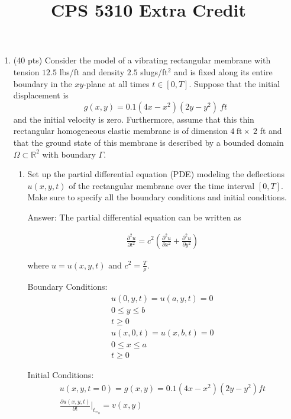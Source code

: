 \documentclass[12pt]{article}
\title{CPS 5310 Extra Credit}
\date{}
\begin{document}
\maketitle

\begin{enumerate}[{\bf I.}] 
\item (40 pts) 
 Consider the model of a vibrating rectangular membrane with tension $12.5$ lbs/ft and density $2.5$ slugs/ft$^2$ and is fixed along its entire boundary in the $xy$-plane at all times $t \in [0,T]$.
Suppose that the initial displacement is %
\[
g(x,y)=0.1(4x-x^2)(2y- y^2) \ ft
\]
and the initial velocity is zero. Furthermore, assume that
this thin rectangular homogeneous elastic membrane is of dimension $4 \ { \text {ft}} \times \ 2$ ft and that the ground state of this membrane is described by a bounded domain $\Omega\subset \mathbb{R}^2$ with boundary $\Gamma.$ %
\begin{enumerate}
\item 
Set up the partial differential equation (PDE) modeling the deflections $u(x,y,t)$ of the rectangular membrane over the time interval $[0,T]$. Make sure to specify all the boundary conditions and initial conditions.

Answer: The partial differential equation can be written as


\begin{align}
\frac{\partial^2 u}{\partial t^2} = c^2 (\frac{\partial^2 u}{\partial x^2} + \frac{\partial^2 u}{\partial y^2})
\end{align}

where $u = u(x,y,t) $ and $c^2= \frac{T}{\rho}$.

Boundary Conditions:
\begin{align}
u(0,y,t) = u(a,y,t) = 0 
\nonumber
\\  0 \leq y \leq b 
\nonumber
\\ t\geq 0
\\u(x,0,t) = u(x,b,t) = 0 
\nonumber
\\  0 \leq x \leq a 
\nonumber
\\ t\geq 0
\end{align}

Initial Conditions:
\begin{align}
u(x,y,t = 0) = g(x,y) =0.1(4x -x^2)(2y -y^2)ft
\\ \frac{\partial u(x,y,t)}{\partial t}|_t_=_0 = v(x,y)   
\end{align}


\end{enumerate}
\end{enumerate}
\end{document}
